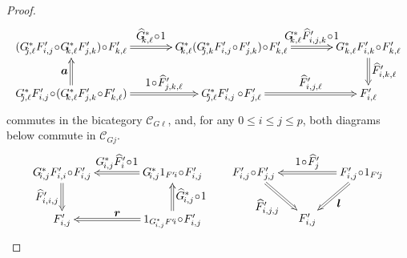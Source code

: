 \documentclass[]{amsart}
\begin{document}
\begin{proof}
\begin{equation}\label{ud}
\xymatrix@C=37pt{ (G_{\hspace{-3pt}j,\ell}^*F'_{i,j}\!\circ\! G_{\hspace{-3pt}k,\ell}^*F'_{j,k})\!\circ\! F'_{k,\ell}\ar@{=>}[r]^-{\textstyle \widehat{G}_{\hspace{-3pt}k,\ell}^*\!\circ\! 1}&G^*_{\hspace{-3pt}k,\ell}(G^*_{\hspace{-3pt}j,k}F'_{i,j}\!\circ\! F'_{j,k})\!\circ\! F'_{k,\ell}\ar@{=>}[r]^-{\textstyle G^*_{\hspace{-3pt}k,\ell}\widehat{F}'_{i,j,k}\!\circ\! 1}&G^*_{k,\ell}F'_{i,k}\!\circ\! F'_{k,\ell}\ar@{=>}[d]^{\textstyle \widehat{F}'_{i,k,\ell}}\\
G_{\hspace{-3pt}j,\ell}^*F'_{i,j}\!\circ\!(G_{\hspace{-3pt}k,\ell}^*F'_{j,k}\!\circ\!
F'_{k,\ell})\ar@{=>}[u]^-{\textstyle\boldsymbol{a}} \ar@{=>}[r]^-{\textstyle
1\!\circ\!\widehat{F}'_{j,k,\ell}}&G^*_{\hspace{-3pt}j,\ell}F'_{i,j}\circ \!F'_{j,\ell}
\ar@{=>}[r]^-{\textstyle \widehat{F}'_{i,j,\ell}}&F'_{i,\ell} }
\end{equation}
commutes in the bicategory ${\ensuremath{\mathcal{C}}}_{G\ell}$, and, for any $0\leq i\leq j\leq p$, both diagrams below
commute in ${\ensuremath{\mathcal{C}}}_{Gj}$.
\begin{equation}\label{ud2}
\xymatrix@C=40pt{ G^*_{\hspace{-2pt}i,j}F'_{i,i}\!\circ\!F'_{i,j}\ar@{=>}[d]_-{\textstyle
\widehat{F}'_{i,i,j}}&G^*_{\hspace{-2pt}i,j}1_{F'\hspace{-1pt}i}\!\circ\!F'_{i,j}
\ar@{=>}[l]_-{\textstyle G^*_{\hspace{-1pt}i,j}\widehat{F}'_{i}\!\circ\! 1}\\
F'_{i,j}&1_{G^*_{\hspace{-1pt}i,j}F'\!i}\!\circ\!F'_{i,j}\ar@{=>}[u]_{\textstyle
\widehat{G}^*_{\hspace{-1pt}i,j}\!\circ\!1}\ar@{=>}[l]_{\textstyle \boldsymbol{r}} }\hspace{0.6cm}
\xymatrix@C=15pt{F'_{i,j}\!\circ\!F'_{j,j}\ar@{=>}[dr]_{\textstyle
\widehat{F}'_{i,j,j}}&&F'_{i,j}\!\circ\!1_{F'\!j}\ar@{=>}[ll]_-{\textstyle
1\!\circ\!\widehat{F}'_j} \ar@{=>}[dl]^{\textstyle \boldsymbol{l}}\\&F'_{i,j}&}
\end{equation}


\end{proof}
\end{document}
